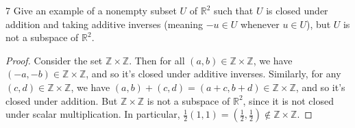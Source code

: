 \documentclass{extarticle}
\newenvironment{problem}[1]{\begin{prob*}{#1}{}}{\end{prob*}}
\newcommand{\Z}{\mathbb{Z}}
\newcommand{\R}{\mathbb{R}}
\begin{document}
\begin{problem}{7}
Give an example of a nonempty subset $U$ of $\R^2$ such that $U$ is closed under addition and taking additive inverses (meaning $-u\in U$ whenever $u\in U$), but $U$ is not a subspace of $\R^2$.
\end{problem}
\begin{proof}
Consider the set $\Z\times \Z$.  Then for all $(a,b)\in\Z\times\Z$, we have $(-a,-b)\in\Z\times\Z$, and so it's closed under additive inverses.  Similarly, for any $(c,d)\in\Z\times \Z$, we have $(a, b) + (c, d) = (a+c, b + d)\in\Z\times \Z$, and so it's closed under addition.  But $\Z\times\Z$ is not a subspace of $\R^2$, since it is not closed under scalar multiplication.  In particular, $\frac{1}{2}(1, 1) = \left(\frac{1}{2}, \frac{1}{2}\right)\not\in\Z\times\Z$. 
\end{proof}
\end{document}

